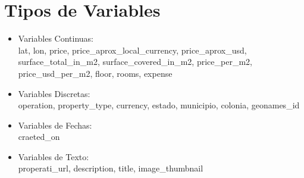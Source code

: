 \documentclass{report}
\begin{document}
    \section{Tipos de Variables}
    \begin{itemize}
        \item Variables Continuas:\\
        lat, lon, price, price\_aprox\_local\_currency, price\_aprox\_usd, surface\_total\_in\_m2, surface\_covered\_in\_m2, price\_per\_m2, price\_usd\_per\_m2, floor, rooms, expense
        \item Variables Discretas:\\
        operation, property\_type, currency, estado, municipio, colonia, geonames\_id
        \item Variables de Fechas:\\
        craeted\_on
        \item Variables de Texto:\\
        properati\_url, description, title, image\_thumbnail
    \end{itemize} 
    
\end{document}
